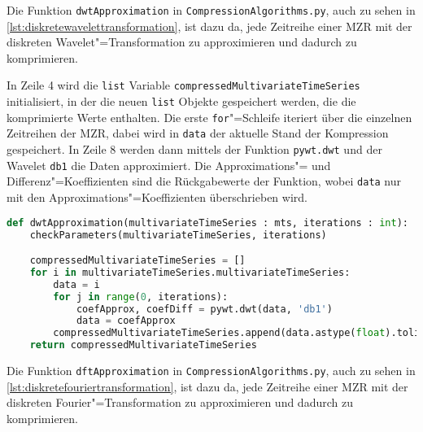 Die Funktion \lstinline|dwtApproximation| in \texttt{CompressionAlgorithms.py}, auch zu sehen in \autoref{lst:diskretewavelettransformation}, ist dazu da, jede Zeitreihe einer \ac{MZR} mit der diskreten Wavelet"=Transformation zu approximieren und dadurch zu komprimieren.

In Zeile 4 wird die \lstinline|list| Variable \lstinline|compressedMultivariateTimeSeries| initialisiert, in der die neuen \lstinline|list| Objekte gespeichert werden, die die komprimierte Werte enthalten. Die erste \lstinline|for|"=Schleife iteriert über die einzelnen Zeitreihen der \ac{MZR}, dabei wird in \lstinline|data| der aktuelle Stand der Kompression gespeichert. In Zeile 8 werden dann mittels der Funktion \lstinline|pywt.dwt| und der Wavelet \lstinline|db1| die Daten approximiert. Die Approximations"= und Differenz"=Koeffizienten sind die Rückgabewerte der Funktion, wobei \lstinline|data| nur mit den Approximations"=Koeffizienten überschrieben wird.
\begin{lstlisting}[caption={Diskrete Wavelet"=Transformation}, label=lst:diskretewavelettransformation, style=Python, language=Python]
def dwtApproximation(multivariateTimeSeries : mts, iterations : int):
    checkParameters(multivariateTimeSeries, iterations)

    compressedMultivariateTimeSeries = []
    for i in multivariateTimeSeries.multivariateTimeSeries:
        data = i
        for j in range(0, iterations):
            coefApprox, coefDiff = pywt.dwt(data, 'db1')
            data = coefApprox
        compressedMultivariateTimeSeries.append(data.astype(float).tolist())
    return compressedMultivariateTimeSeries
\end{lstlisting}

Die Funktion \lstinline|dftApproximation| in \texttt{CompressionAlgorithms.py}, auch zu sehen in \autoref{lst:diskretefouriertransformation}, ist dazu da, jede Zeitreihe einer \ac{MZR} mit der diskreten Fourier"=Transformation zu approximieren und dadurch zu komprimieren.

